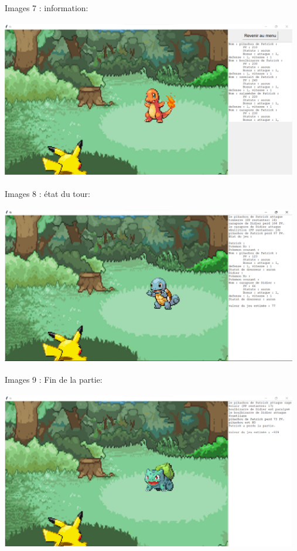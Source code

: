             Images 7 : information:
            
            \includegraphics[width=13cm,height=7cm]{images/information}
            
            Images 8 : état du tour:
            
            \includegraphics[width=13cm,height=7cm]{images/etat_tour}
            
            Images 9 : Fin de la partie:
            
            \includegraphics[width=13cm,height=7cm]{images/fin_partie}

            
        
    
        